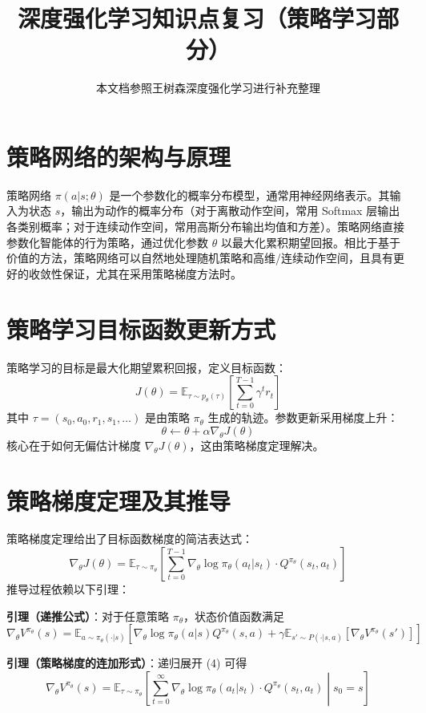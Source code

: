\documentclass{article}
\title{深度强化学习知识点复习（策略学习部分）}
\author{本文档参照王树森深度强化学习进行补充整理}
\begin{document}
\maketitle

\section{策略网络的架构与原理}
策略网络 \(\pi(a|s;\theta)\) 是一个参数化的概率分布模型，通常用神经网络表示。其输入为状态 \(s\)，输出为动作的概率分布（对于离散动作空间，常用 Softmax 层输出各类别概率；对于连续动作空间，常用高斯分布输出均值和方差）。策略网络直接参数化智能体的行为策略，通过优化参数 \(\theta\) 以最大化累积期望回报。相比于基于价值的方法，策略网络可以自然地处理随机策略和高维/连续动作空间，且具有更好的收敛性保证，尤其在采用策略梯度方法时。

\section{策略学习目标函数更新方式}
策略学习的目标是最大化期望累积回报，定义目标函数：
\[
J(\theta) = \mathbb{E}_{\tau \sim p_\theta(\tau)} \left[ \sum_{t=0}^{T-1} \gamma^t r_t \right] \tag{1}
\]
其中 \(\tau = (s_0,a_0,r_1,s_1,\dots)\) 是由策略 \(\pi_\theta\) 生成的轨迹。参数更新采用梯度上升：
\[
\theta \leftarrow \theta + \alpha \nabla_\theta J(\theta) \tag{2}
\]
核心在于如何无偏估计梯度 \(\nabla_\theta J(\theta)\)，这由策略梯度定理解决。

\section{策略梯度定理及其推导}
策略梯度定理给出了目标函数梯度的简洁表达式：
\[
\nabla_\theta J(\theta) = \mathbb{E}_{\tau \sim \pi_\theta} \left[ \sum_{t=0}^{T-1} \nabla_\theta \log \pi_\theta(a_t|s_t) \cdot Q^{\pi_\theta}(s_t,a_t) \right] \tag{3}
\]
推导过程依赖以下引理：

\textbf{引理（递推公式）}：对于任意策略 \(\pi_\theta\)，状态价值函数满足
\[
\nabla_\theta V^{\pi_\theta}(s) = \mathbb{E}_{a\sim\pi_\theta(\cdot|s)} \left[ \nabla_\theta \log \pi_\theta(a|s) Q^{\pi_\theta}(s,a) + \gamma \mathbb{E}_{s'\sim P(\cdot|s,a)} \left[ \nabla_\theta V^{\pi_\theta}(s') \right] \right] \tag{4}
\]

\textbf{引理（策略梯度的连加形式）}：递归展开 (4) 可得
\[
\nabla_\theta V^{\pi_\theta}(s) = \mathbb{E}_{\tau \sim \pi_\theta} \left[ \sum_{t=0}^{\infty} \nabla_\theta \log \pi_\theta(a_t|s_t) \cdot Q^{\pi_\theta}(s_t,a_t) \middle| s_0=s \right] \tag{5}
\]
\end{document}
